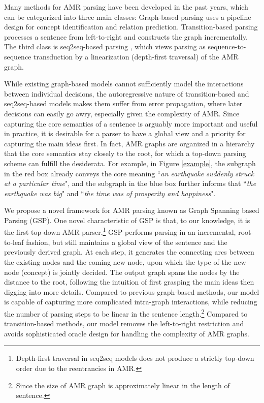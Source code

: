 \documentclass[11pt,a4paper]{article}
\begin{document}
	Many methods for AMR parsing have been developed in the past years, which can be categorized into three main classes: Graph-based parsing \cite{flanigan2014discriminative,lyu2018amr} uses a pipeline design for concept identification and relation prediction. Transition-based parsing \cite{wang2016camr,damonte2016incremental,ballesteros2017amr,guo2018better,liu2018amr,wang2017getting} processes a sentence from left-to-right and constructs the graph incrementally. The third class is seq2seq-based parsing \cite{barzdins2016riga,konstas2017neural,van2017neural}, which views parsing as sequence-to-sequence transduction by a linearization (depth-first traversal) of the AMR graph. 
	
	While existing graph-based models cannot sufficiently model the interactions between individual decisions, the autoregressive nature of transition-based and seq2seq-based models makes them suffer from error propagation, where later decisions can easily go awry, especially given the complexity of AMR. Since capturing the core semantics of a sentence is arguably more important and useful in practice, it is desirable for a parser to have a global view and a priority for capturing the main ideas first. In fact, AMR graphs are organized in a hierarchy that the core semantics stay closely to the root, for which a top-down parsing scheme can fulfill the desiderata. For example, in Figure \ref{example}, the subgraph in the red box already conveys the core meaning ``\textit{an earthquake suddenly struck at a particular time}", and the subgraph in the blue box further informs that ``\textit{the earthquake was big}" and ``\textit{the time was of prosperity and happiness}".
	
	We propose a novel framework for AMR parsing known as Graph Spanning based Parsing (GSP). One novel characteristic of GSP is that, to our knowledge, it is the first top-down AMR parser.\footnote{Depth-first traversal in seq2seq models does not produce a strictly top-down order due to the reentrancies in AMR.} GSP performs parsing in an incremental, root-to-leaf fashion, but still maintains a global view of the sentence and the previously derived graph. At each step, it generates the connecting arcs between the existing nodes and the coming new node, upon which the type of the new node (concept) is jointly decided. The output graph spans the nodes by the distance to the root, following the intuition of first grasping the main ideas then digging into more details. Compared to previous graph-based methods, our model is capable of capturing more complicated intra-graph interactions, while reducing the number of parsing steps to be linear in the sentence length.\footnote{Since the size of AMR graph is approximately linear in the length of sentence.} Compared to transition-based methods, our model removes the left-to-right restriction and avoids sophisticated oracle design for handling the complexity of AMR graphs.
	
\end{document}
